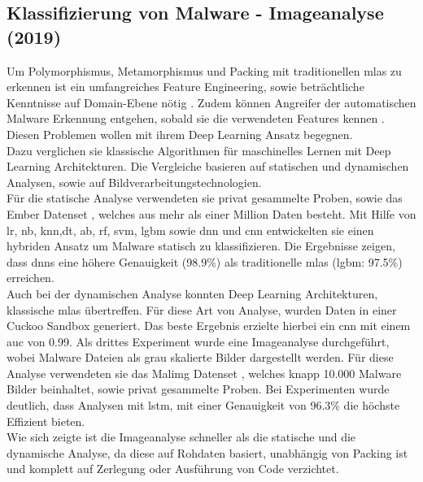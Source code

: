 \documentclass[
    12pt, %
    DIV10,
    ngerman, %
    a4paper, %
    oneside, %
    titlepage, %
    parskip=half, %
    headings=normal, %
    listof=totoc, %
    bibliography=totoc, %
    index=totoc, %
    captions=tableheading, %
    final %
]{scrreprt}
\begin{document}
%
\subsection{Klassifizierung von Malware - Imageanalyse (2019)}\label{ember}
Um Polymorphismus, Metamorphismus und Packing mit traditionellen \ac{mlas} zu erkennen ist ein umfangreiches Feature Engineering, sowie beträchtliche Kenntnisse auf Domain-Ebene nötig \parencite{rhode2018early}. Zudem können Angreifer der automatischen Malware Erkennung entgehen, sobald sie die verwendeten Features kennen \parencite{anderson2017evading}. Diesen Problemen wollen \textcite{Vinayakumar2019} mit ihrem Deep Learning Ansatz begegnen.\\
Dazu verglichen sie klassische Algorithmen für maschinelles Lernen mit Deep Learning Architekturen. Die Vergleiche basieren auf statischen und dynamischen Analysen, sowie auf Bildverarbeitungstechnologien.\\
Für die statische Analyse verwendeten sie privat gesammelte Proben, sowie das Ember Datenset \parencite{anderson2018ember}, welches aus mehr als einer Million Daten besteht. Mit Hilfe von \ac{lr}, \ac{nb}, \ac{knn},\ac{dt}, \ac{ab}, \ac{rf}, \ac{svm}, \ac{lgbm} sowie \ac{dnn} und \ac{cnn} entwickelten sie einen hybriden Ansatz um Malware statisch zu klassifizieren. Die Ergebnisse zeigen, dass \ac{dnns} eine höhere Genauigkeit (98.9\%) als traditionelle \ac{mlas} (\ac{lgbm}: 97.5\%) erreichen.\\
Auch bei der dynamischen Analyse konnten Deep Learning Architekturen, klassische \ac{mlas} übertreffen. Für diese Art von Analyse, wurden Daten in einer Cuckoo Sandbox generiert. Das beste Ergebnis erzielte hierbei ein \ac{cnn} mit einem \ac{auc} von 0.99. Als drittes Experiment wurde eine Imageanalyse durchgeführt, wobei Malware Dateien als grau skalierte Bilder dargestellt werden. Für diese Analyse verwendeten sie das Malimg Datenset \parencite{nataraj2011malware}, welches knapp 10.000 Malware Bilder beinhaltet, sowie privat gesammelte Proben. Bei Experimenten wurde deutlich, dass Analysen mit \ac{lstm}, mit einer Genauigkeit von 96.3\% die höchste Effizient bieten.\\
Wie sich zeigte ist die Imageanalyse schneller als die statische und die dynamische Analyse, da diese auf Rohdaten basiert, unabhängig von Packing ist und komplett auf Zerlegung oder Ausführung von Code verzichtet. 
\end{document}
